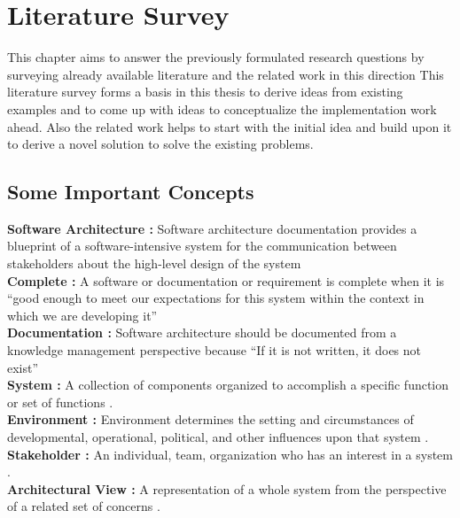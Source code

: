 \chapter{Literature Survey}\label{chapter:LiteratureSurvey}

This chapter aims to answer the previously formulated research questions by surveying already available literature and the related work in this direction This literature survey forms a basis in this thesis to derive ideas from existing examples and to come up with ideas to conceptualize the implementation work ahead. Also the related work helps to start with the initial idea and build upon it to derive a novel solution to solve the existing problems.
\section{Some Important Concepts}
\indent \textbf{Software Architecture : } Software architecture documentation provides a blueprint of a software-intensive system for the communication between stakeholders about the high-level design of the system \cite{6923128}
\newline
\\\indent \textbf{Complete : } A software or documentation or requirement is complete when it is \enquote{good enough to meet our expectations for this system within the context in which we are developing it}  \cite{BachmannDocumentingSoftware2010}
\newline
\\\indent \textbf{Documentation : } Software architecture should be documented from a knowledge management perspective because \enquote{If it is not written, it does not exist} \cite{bab2009}
\newline
\\\indent \textbf{System : }A collection of components organized to accomplish a specific function or set of functions \cite{Standard2007}.
\newline
\\\indent \textbf{Environment : }Environment determines the setting and circumstances of developmental, operational, political, and other influences upon that system \cite{Standard2007}. 
\newline
\\\indent \textbf{Stakeholder : } An individual, team, organization who has an interest in a system \cite{Standard2007}.
\newline
\\\indent \textbf{Architectural View : } A representation of a whole system from the perspective of a related set of concerns \cite{Standard2007}.

